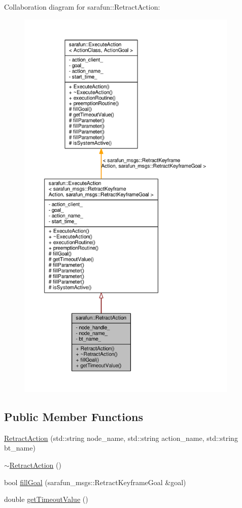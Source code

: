 Collaboration diagram for sarafun\-:\-:Retract\-Action\-:
\nopagebreak
\begin{figure}[H]
\begin{center}
\leavevmode
\includegraphics[height=550pt]{de/d4f/classsarafun_1_1RetractAction__coll__graph}
\end{center}
\end{figure}
\subsection*{Public Member Functions}
\begin{DoxyCompactItemize}
\item 
\hyperlink{classsarafun_1_1RetractAction_a0f56a3d5ff6c07f48bbd3cede93f0a81_a0f56a3d5ff6c07f48bbd3cede93f0a81}{Retract\-Action} (std\-::string node\-\_\-name, std\-::string action\-\_\-name, std\-::string bt\-\_\-name)
\item 
\hyperlink{classsarafun_1_1RetractAction_adb37a0fb90d06636009f90b7565f00cf_adb37a0fb90d06636009f90b7565f00cf}{$\sim$\-Retract\-Action} ()
\item 
bool \hyperlink{classsarafun_1_1RetractAction_ad0db1c2615d68603bc972ffa26049a70_ad0db1c2615d68603bc972ffa26049a70}{fill\-Goal} (sarafun\-\_\-msgs\-::\-Retract\-Keyframe\-Goal \&goal)
\item 
double \hyperlink{classsarafun_1_1RetractAction_af95bb8d3826dbe1444a8a3e12d8596b0_af95bb8d3826dbe1444a8a3e12d8596b0}{get\-Timeout\-Value} ()
\end{DoxyCompactItemize}
